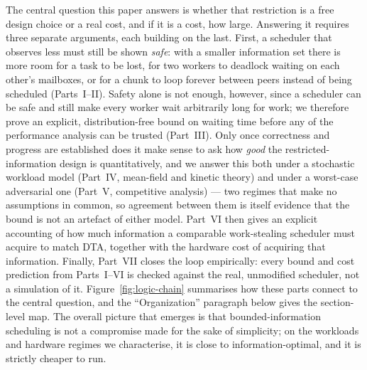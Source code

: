 \documentclass[11pt,a4paper]{report}
\begin{document}
The central question this paper answers is whether that restriction is a
free design choice or a real cost, and if it is a cost, how large. Answering
it requires three separate arguments, each building on the last. First, a
scheduler that observes less must still be shown \emph{safe}: with a
smaller information set there is more room for a task to be lost, for two
workers to deadlock waiting on each other's mailboxes, or for a chunk to
loop forever between peers instead of being scheduled (Parts~I--II).
Safety alone is not enough, however, since a scheduler can be safe and
still make every worker wait arbitrarily long for work; we therefore prove
an explicit, distribution-free bound on waiting time before any of the
performance analysis can be trusted (Part~III). Only once correctness and
progress are established does it make sense to ask how \emph{good} the
restricted-information design is quantitatively, and we answer this both
under a stochastic workload model (Part~IV, mean-field and kinetic theory)
and under a worst-case adversarial one (Part~V, competitive analysis) ---
two regimes that make no assumptions in common, so agreement between them
is itself evidence that the bound is not an artefact of either model.
Part~VI then gives an explicit accounting of how much information a
comparable work-stealing scheduler must acquire to match DTA, together
with the hardware cost of acquiring that information. Finally, Part~VII
closes the loop empirically: every bound and cost prediction from
Parts~I--VI is checked against the real, unmodified scheduler, not a
simulation of it. Figure~\ref{fig:logic-chain} summarises how these parts
connect to the central question, and the ``Organization'' paragraph below
gives the section-level map. The overall picture that emerges is that
bounded-information scheduling is not a compromise made for the sake of
simplicity; on the workloads and hardware regimes we characterise, it is
close to information-optimal, and it is strictly cheaper to run.
\end{document}
